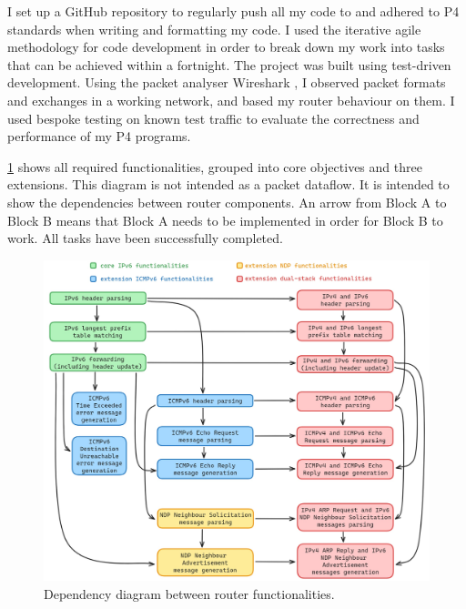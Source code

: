 I set up a GitHub repository to regularly push all my code to and adhered to P4 standards when writing and formatting my code. I used the iterative agile methodology for code development in order to break down my work into tasks that can be achieved within a fortnight. The project was built using test-driven development. Using the packet analyser Wireshark \cite{Wireshark}, I observed packet formats and exchanges in a working network, and based my router behaviour on them. I used bespoke testing on known test traffic to evaluate the correctness and performance of my P4 programs.

\cref{fig:prep-req} shows all required functionalities, grouped into core objectives and three extensions. This diagram is not intended as a packet dataflow. It is intended to show the dependencies between router components. An arrow from Block A to Block B means that Block A needs to be implemented in order for Block B to work. All tasks have been successfully completed.

\begin{figure}[hbtp]
  \centering
    \includegraphics[width=1\textwidth]{figures/preparation/req_analysis.jpg}
     \caption{Dependency diagram between router functionalities.}
     \label{fig:prep-req}
\end{figure}